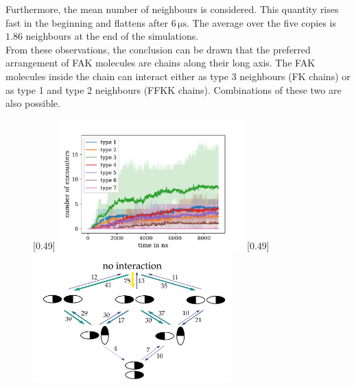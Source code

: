Furthermore, the mean number of neighbours is considered. This quantity rises fast in the beginning and flattens after $6\,\si{\micro\second}$. The average over the five copies is $1.86$ neighbours at the end of the simulations.\\
From these observations, the conclusion can be drawn that the preferred arrangement of FAK molecules are chains along their long axis. The FAK molecules inside the chain can interact either as type 3 neighbours (FK chains) or as type 1 and type 2 neighbours (FFKK chains). Combinations of these two are also possible.
%
%
%
\begin{figure}
	\subcaptionbox{\label{mult:inttype_vs_t}}[0.49\textwidth]{
		\includegraphics[height=5cm]{figures/results/multiple_typevstime}
	}\hfill%
	\subcaptionbox{\label{mult:inttype_markov}}[0.49\textwidth]{
		\includegraphics[height=5cm]{figures/results/markov}
	}%
	\label{mult:inttype_both}
\end{figure}
%
%
%
